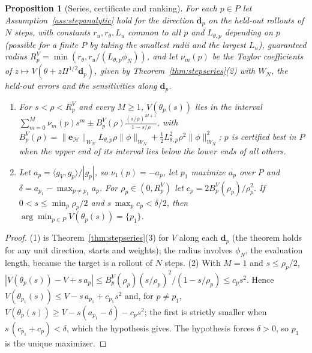 \documentclass[11pt]{article}
\newtheorem{proposition}{Proposition}
\theoremstyle{definition}
\theoremstyle{remark}
\newcommand{\ee}{\mathbf{e}}
\begin{document}
\begin{proposition}[Series, certificate and ranking]\label{prop:bestp}
For each $p\in P$ let Assumption~\ref{ass:stepanalytic} hold for the direction $\mathbf d_p$ on the held-out rollouts of $N$ steps, with constants $r_u,r_\theta,L_u$ common to all $p$ and $L_{\theta,p}$ depending on $p$ (possible for a finite $P$ by taking the smallest radii and the largest $L_u$), guaranteed radius $R^V_p=\min(r_\theta,r_u/(L_{\theta,p}\phi_N))$, and let $\nu_m(p)$ be the Taylor coefficients of $z\mapsto V(\theta+z\Pi^{1/2}\mathbf d_p)$, given by Theorem~\ref{thm:stepseries}(2) with $W_N$, the held-out errors and the sensitivities along $\mathbf d_p$.
\begin{enumerate}
\item For $s<\rho<R^V_p$ and every $M\ge1$, $V(\theta_p(s))$ lies in the interval $\sum_{m=0}^M\nu_m(p)s^m\pm B^V_p(\rho)\frac{(s/\rho)^{M+1}}{1-s/\rho}$, with $B^V_p(\rho)=\|\ee_{\mathcal H}\|_{W_N}L_{\theta,p}\rho\|\phi\|_{W_N}+\tfrac12L_{\theta,p}^2\rho^2\|\phi\|_{W_N}^2$; $p$ is certified best in $P$ when the upper end of its interval lies below the lower ends of all others.
\item Let $a_p=\langle g_V,g_p\rangle/|g_p|$, so $\nu_1(p)=-a_p$, let $p_1$ maximize $a_p$ over $P$ and $\delta=a_{p_1}-\max_{p\ne p_1}a_p$. For $\rho_p\in(0,R^V_p)$ let $c_p=2B^V_p(\rho_p)/\rho_p^2$. If $0<s\le\min_p\rho_p/2$ and $s\,\max_pc_p<\delta/2$, then $\arg\min_{p\in P}V(\theta_p(s))=\{p_1\}$.
\end{enumerate}
\end{proposition}

\begin{proof}
(1) is Theorem~\ref{thm:stepseries}(3) for $V$ along each $\mathbf d_p$ (the theorem holds for any unit direction, starts and weights); the radius involves $\phi_N$, the evaluation length, because the target is a rollout of $N$ steps.
(2) With $M=1$ and $s\le\rho_p/2$, $|V(\theta_p(s))-V+s\,a_p|\le B^V_p(\rho_p)(s/\rho_p)^2/(1-s/\rho_p)\le c_ps^2$. Hence $V(\theta_{p_1}(s))\le V-s\,a_{p_1}+c_{p_1}s^2$ and, for $p\ne p_1$, $V(\theta_p(s))\ge V-s(a_{p_1}-\delta)-c_ps^2$; the first is strictly smaller when $s\,(c_{p_1}+c_p)<\delta$, which the hypothesis gives. The hypothesis forces $\delta>0$, so $p_1$ is the unique maximizer.
\end{proof}
\end{document}
